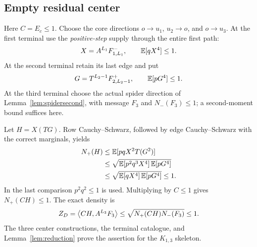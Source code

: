 \subsection{Empty residual center}\label{sec:emptystar}
Here $C=E_c\le1$. Choose the core directions $o\to u_1$, $u_2\to o$, and $o\to u_3$. At the first terminal use the \emph{positive-step} supply through the entire first path:
\[
 X=A^{L_1}F^-_{1,L_1},\qquad \mathbb E[qX^4]\le1.
\]
At the second terminal retain its last edge and put
\[
 G=T^{L_2-1}F^+_{2,L_2-1},\qquad \mathbb E[pG^4]\le1.
\]
At the third terminal choose the actual spider direction of Lemma~\ref{lem:spidersecond}, with message $F_3$ and $N_-(F_3)\le1$; a second-moment bound suffices here.

Let $H=X(TG)$. Row Cauchy--Schwarz, followed by edge Cauchy--Schwarz with the correct marginals, yields
\begin{align*}
 N_+(H)&\le\mathbb E[pqX^2T(G^2)]\\
 &\le\sqrt{\mathbb E[p^2q^3X^4]\,\mathbb E[pG^4]}\\
 &\le\sqrt{\mathbb E[qX^4]\,\mathbb E[pG^4]}\le1.
\end{align*}
In the last comparison $p^2q^2\le1$ is used. Multiplying by $C\le1$ gives $N_+(CH)\le1$. The exact density is
\[
 Z_D=\left\langle CH,A^{L_3}F_3\right\rangle
 \le\sqrt{N_+(CH)N_-(F_3)}\le1.
\]
The three center constructions, the terminal catalogue, and Lemma~\ref{lem:reduction} prove the assertion for the $K_{1,3}$ skeleton.
